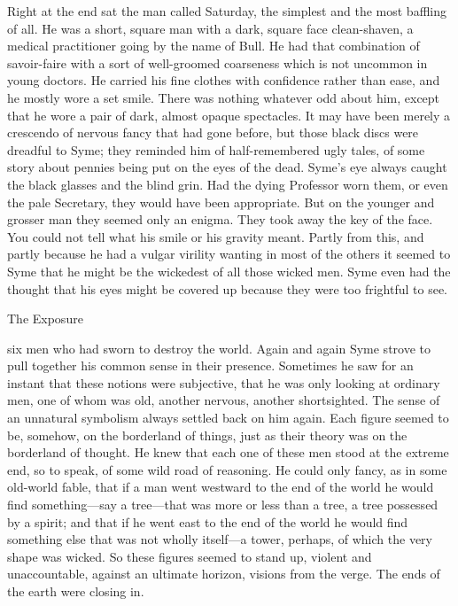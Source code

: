 Right at the end sat the man called Saturday, the simplest and the most baffling of all. He was a short, square man with a dark, square face clean-shaven, a medical practitioner going by the name of Bull. He had that combination of savoir-faire with a sort of well-groomed coarseness which is not uncommon in young doctors. He carried his fine clothes with confidence rather than ease, and he mostly wore a set smile. There was nothing whatever odd about him, except that he wore a pair of dark, almost opaque spectacles. It may have been merely a crescendo of nervous fancy that had gone before, but those black discs were dreadful to Syme; they reminded him of half-remembered ugly tales, of some story about pennies being put on the eyes of the dead. Syme’s eye always caught the black glasses and the blind grin. Had the dying Professor worn them, or even the pale Secretary, they would have been appropriate. But on the younger and grosser man they seemed only an enigma. They took away the key of the face. You could not tell what his smile or his gravity meant. Partly from this, and partly because he had a vulgar virility wanting in most of the others it seemed to Syme that he might be the wickedest of all those wicked men. Syme even had the thought that his eyes might be covered up because they were too frightful to see.

\chap[exposure] The Exposure

 six men who had sworn to destroy the world. Again and again Syme strove to pull together his common sense in their presence. Sometimes he saw for an instant that these notions were subjective, that he was only looking at ordinary men, one of whom was old, another nervous, another shortsighted. The sense of an unnatural symbolism always settled back on him again. Each figure seemed to be, somehow, on the borderland of things, just as their theory was on the borderland of thought. He knew that each one of these men stood at the extreme end, so to speak, of some wild road of reasoning. He could only fancy, as in some old-world fable, that if a man went westward to the end of the world he would find something⁠—say a tree⁠—that was more or less than a tree, a tree possessed by a spirit; and that if he went east to the end of the world he would find something else that was not wholly itself⁠—a tower, perhaps, of which the very shape was wicked. So these figures seemed to stand up, violent and unaccountable, against an ultimate horizon, visions from the verge. The ends of the earth were closing in.

